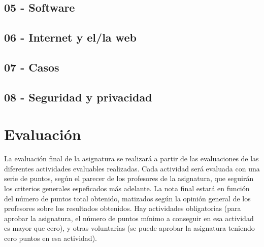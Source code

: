\documentclass[a4paper,12pt]{article}
\begin{document}
\subsection{05 - Software}

\subsection{06 - Internet y el/la web}

\subsection{07 - Casos}

\subsection{08 - Seguridad y privacidad}



\section{Evaluación}

La evaluación final de la asignatura se realizará a partir de las evaluaciones de las diferentes actividades evaluables realizadas. Cada actividad será evaluada con una serie de puntos, según el parecer de los profesores de la asignatura, que seguirán los criterios generales espeficados más adelante. La nota final estará en función del número de puntos total obtenido, matizados según la opinión general de los profesores sobre los resultados obtenidos. Hay actividades obligatorias (para aprobar la asignatura, el número de puntos mínimo a conseguir en esa actividad es mayor que cero), y otras voluntarias (se puede aprobar la asignatura teniendo cero puntos en esa actividad).
\end{document}
